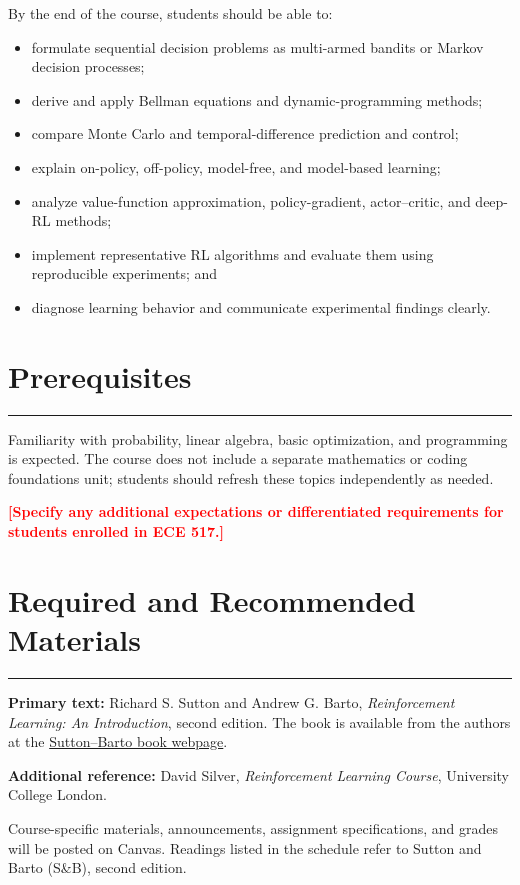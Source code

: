 \documentclass[11pt]{article}
\newcommand{\sectionrule}{\vspace{-0.4em}\color{utorange}\rule{\linewidth}{0.8pt}\color{black}}
\newcommand{\placeholder}[1]{\textcolor{red}{\textbf{[#1]}}}
\begin{document}
By the end of the course, students should be able to:
\begin{itemize}
  \item formulate sequential decision problems as multi-armed bandits or Markov decision processes;
  \item derive and apply Bellman equations and dynamic-programming methods;
  \item compare Monte Carlo and temporal-difference prediction and control;
  \item explain on-policy, off-policy, model-free, and model-based learning;
  \item analyze value-function approximation, policy-gradient, actor--critic, and deep-RL methods;
  \item implement representative RL algorithms and evaluate them using reproducible experiments; and
  \item diagnose learning behavior and communicate experimental findings clearly.
\end{itemize}

\section*{Prerequisites}
\sectionrule

Familiarity with probability, linear algebra, basic optimization, and programming is expected. The course does not include a separate mathematics or coding foundations unit; students should refresh these topics independently as needed.

\placeholder{Specify any additional expectations or differentiated requirements for students enrolled in ECE 517.}

\section*{Required and Recommended Materials}
\sectionrule

\textbf{Primary text:} Richard S. Sutton and Andrew G. Barto, \emph{Reinforcement Learning: An Introduction}, second edition. The book is available from the authors at the \href{http://incompleteideas.net/book/the-book-2nd.html}{Sutton--Barto book webpage}.

\textbf{Additional reference:} David Silver, \emph{Reinforcement Learning Course}, University College London.

Course-specific materials, announcements, assignment specifications, and grades will be posted on Canvas. Readings listed in the schedule refer to Sutton and Barto (S\&B), second edition.
\end{document}
